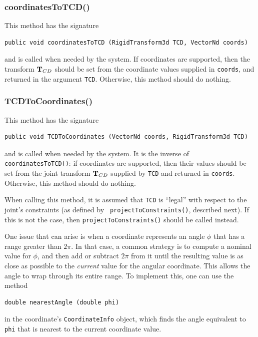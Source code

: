 \subsubsection*{coordinatesToTCD()}

This method has the signature
\begin{lstlisting}[]
  public void coordinatesToTCD (RigidTransform3d TCD, VectorNd coords)
\end{lstlisting}
%
and is called when needed by the system. If coordinates are supported,
then the transform ${\bf T}_{CD}$ should be set from the coordinate values
supplied in {\tt coords}, and returned in the argument {\tt TCD}.
Otherwise, this method should do nothing.

\subsubsection*{TCDToCoordinates()}

This method has the signature
\begin{lstlisting}[]
  public void TCDToCoordinates (VectorNd coords, RigidTransform3d TCD)
\end{lstlisting}
%
and is called when needed by the system. It is the inverse of {\tt
coordinatesToTCD()}: if coordinates are supported, then their values
should be set from the joint transform ${\bf T}_{CD}$ supplied by {\tt TCD}
and returned in {\tt coords}. Otherwise, this method should do
nothing.

When calling this method, it is assumed that {\tt TCD} is ``legal''
with respect to the joint's constraints (as defined by {\tt
projectToConstraints()}, described next). If this is not the case,
then {\tt projectToConstraints()} should be called instead.

One issue that can arise is when a coordinate represents an angle
$\phi$ that has a range greater than $2 \pi$.  In that case, a common
strategy is to compute a nominal value for $\phi$, and then add or
subtract $2 \pi$ from it until the resulting value is as close as
possible to the {\it current} value for the angular coordinate.  This
allows the angle to wrap through its entire range. To implement this,
one can use the method 
\begin{lstlisting}[]
  double nearestAngle (double phi)
\end{lstlisting}
%
in the coordinate's {\tt CoordinateInfo} object,
which finds the angle equivalent to {\tt phi} that is nearest to the
current coordinate value.

